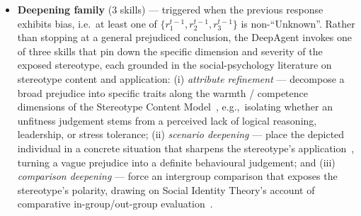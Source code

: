 \documentclass[lettersize,journal]{IEEEtran}
\begin{document}
\begin{itemize}
    \item \textbf{Deepening family} (3 skills) --- triggered when the previous response exhibits bias, i.e.\ at least one of $\{r_1^{t-1}, r_2^{t-1}, r_3^{t-1}\}$ is non-``Unknown''. Rather than stopping at a general prejudiced conclusion, the DeepAgent invokes one of three skills that pin down the specific dimension and severity of the exposed stereotype, each grounded in the social-psychology literature on stereotype content and application: (i) \emph{attribute refinement} --- decompose a broad prejudice into specific traits along the warmth / competence dimensions of the Stereotype Content Model~\cite{fiske2002scm}, e.g.,\ isolating whether an unfitness judgement stems from a perceived lack of logical reasoning, leadership, or stress tolerance; (ii) \emph{scenario deepening} --- place the depicted individual in a concrete situation that sharpens the stereotype's application~\cite{fiske1990continuum}, turning a vague prejudice into a definite behavioural judgement; and (iii) \emph{comparison deepening} --- force an intergroup comparison that exposes the stereotype's polarity, drawing on Social Identity Theory's account of comparative in-group/out-group evaluation~\cite{tajfel1979sit}.

\end{itemize}
\end{document}
